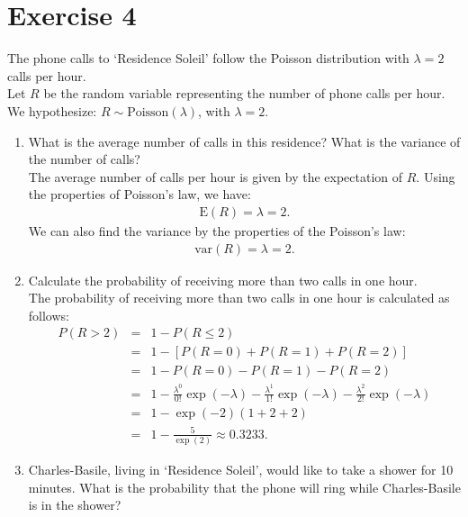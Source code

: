 \documentclass[12pt,thmsa]{article}\usepackage[]{graphicx}\usepackage[]{color}
\begin{document}
\section*{Exercise 4}

The phone calls to `Residence Soleil' follow the Poisson distribution with $\lambda = 2$ calls per hour.\\

Let $ R $ be the random variable representing the number of phone calls per hour. We hypothesize: $R \sim \text{Poisson}(\lambda)$, with $\lambda=2$.

\begin{enumerate}%
\item What is the average number of calls in this residence? What is the variance of the number of calls?\\

The average number of calls per hour is given by the expectation of $ R $. Using the properties of Poisson's law, we have:\begin{eqnarray*}
  \text{E}(R) = \lambda = 2.
\end{eqnarray*}
We can also find the variance by the properties of the Poisson's law:
\begin{eqnarray*}
\text{var}(R) = \lambda = 2.
\end{eqnarray*}


\item Calculate the probability of receiving more than two calls in one hour.\\

The probability of receiving more than two calls in one hour is calculated as follows:
\begin{eqnarray*}
P(R>2) & = & \left. 1-P(R\leq 2)  \right. \nonumber \\
& = & \left. 1- \left[P(R=0)+P(R=1)+P(R=2)\right] \right. \nonumber \\
& = & \left. 1- P(R=0)-P(R=1)-P(R=2) \right. \nonumber \\
& = & \left. 1- \frac{\lambda^{0}}{0!}\exp(-\lambda)-\frac{\lambda^{1}}{1!}\exp(-\lambda)-\frac{\lambda^{2}}{2!}\exp(-\lambda) \right. \nonumber \\
& = & \left. 1- \exp(-2)(1+2+2) \right. \nonumber \\
& = & \left. 1-\frac{5}{\exp(2)} \approx 0.3233. \right. \nonumber
\end{eqnarray*}


\item Charles-Basile, living in `Residence Soleil', would like to take a shower for 10 minutes.
What is the probability that the phone will ring while Charles-Basile is in the shower?\\


\end{enumerate}
\end{document}
